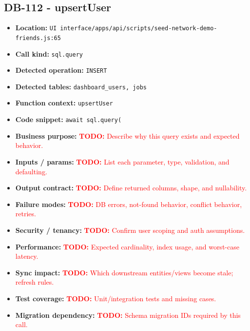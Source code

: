 \documentclass[11pt]{article}
\newcommand{\todoitem}[1]{\textcolor{red}{\textbf{TODO:} #1}}
\begin{document}
\subsection{DB-112 - upsertUser}
\begin{itemize}[leftmargin=1.5em]
\item \textbf{Location:} \texttt{UI interface/apps/api/scripts/seed-network-demo-friends.js:65}
\item \textbf{Call kind:} \texttt{sql.query}
\item \textbf{Detected operation:} \texttt{INSERT}
\item \textbf{Detected tables:} \texttt{dashboard\_users, jobs}
\item \textbf{Function context:} \texttt{upsertUser}
\item \textbf{Code snippet:} \texttt{await sql.query(}
\item \textbf{Business purpose:} \todoitem{Describe why this query exists and expected behavior.}
\item \textbf{Inputs / params:} \todoitem{List each parameter, type, validation, and defaulting.}
\item \textbf{Output contract:} \todoitem{Define returned columns, shape, and nullability.}
\item \textbf{Failure modes:} \todoitem{DB errors, not-found behavior, conflict behavior, retries.}
\item \textbf{Security / tenancy:} \todoitem{Confirm user scoping and auth assumptions.}
\item \textbf{Performance:} \todoitem{Expected cardinality, index usage, and worst-case latency.}
\item \textbf{Sync impact:} \todoitem{Which downstream entities/views become stale; refresh rules.}
\item \textbf{Test coverage:} \todoitem{Unit/integration tests and missing cases.}
\item \textbf{Migration dependency:} \todoitem{Schema migration IDs required by this call.}
\end{itemize}
\end{document}

